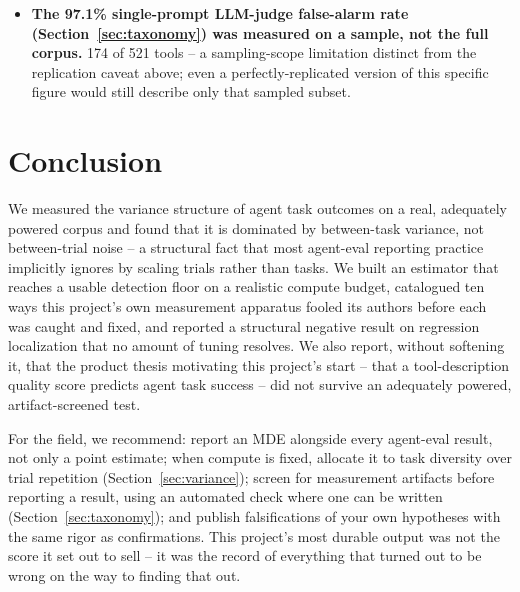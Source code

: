 \documentclass[11pt]{article}
\begin{document}
\begin{itemize}
  dataset, or a second data-collection pass. Four results are an exception, each verified by a
  second script or agent re-deriving the same statistic from the same raw data: the ICC and its
  $N=5{,}535$ base, the corrected MDE of 0.0537 at $n=253$, the
  \texttt{type\_\allowbreak enum\_\allowbreak contradiction} effect-size range, and the
  tool-name-ceiling correction underlying Section~\ref{sec:taxonomy}. One further figure, the
  bootstrap replay-determinism claim underlying Section~\ref{sec:estimator}, is explicitly assumed
  rather than freshly measured -- inherited from an earlier measurement, confirmed only by code
  inspection. The full per-claim provenance record (which results are single-pass and which are
  independently recomputed, with report path and commit SHA for each) is published alongside the
  code at \url{https://github.com/gaurav-gandhi-2411/agentgauge} (\texttt{agentgauge-harness==0.5.3}
  on PyPI).
\item \textbf{The 97.1\% single-prompt LLM-judge false-alarm rate (Section~\ref{sec:taxonomy}) was
  measured on a sample, not the full corpus.} 174 of 521 tools -- a sampling-scope limitation
  distinct from the replication caveat above; even a perfectly-replicated version of this specific
  figure would still describe only that sampled subset.
\end{itemize}

\section{Conclusion}
\label{sec:conclusion}

We measured the variance structure of agent task outcomes on a real, adequately powered corpus and
found that it is dominated by between-task variance, not between-trial noise -- a structural fact
that most agent-eval reporting practice implicitly ignores by scaling trials rather than tasks. We
built an estimator that reaches a usable detection floor on a realistic compute budget, catalogued
ten ways this project's own measurement apparatus fooled its authors before each was caught and
fixed, and reported a structural negative result on regression localization that no amount of
tuning resolves. We also report, without softening it, that the product thesis motivating this
project's start -- that a tool-description quality score predicts agent task success -- did not
survive an adequately powered, artifact-screened test.

For the field, we recommend: report an MDE alongside every agent-eval result, not only a point
estimate; when compute is fixed, allocate it to task diversity over trial repetition
(Section~\ref{sec:variance}); screen for measurement artifacts before reporting a result, using an
automated check where one can be written (Section~\ref{sec:taxonomy}); and publish falsifications
of your own hypotheses with the same rigor as confirmations. This project's most durable output
was not the score it set out to sell -- it was the record of everything that turned out to be
wrong on the way to finding that out.
\end{document}
